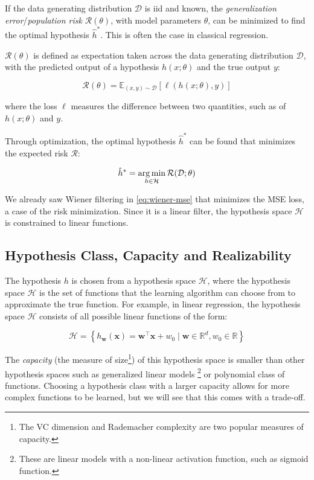 If the data generating distribution $\mathcal{D}$ is \gls{iid} and known, the \textit{generalization error}/\textit{population risk} $\mathcal{R}(\theta)$, with model parameters $\theta$, can be minimized to find the optimal hypothesis $\hat{h}^*$. This is often the case in classical regression.

$\mathcal{R}(\theta)$ is defined as expectation taken across the data generating distribution $\mathcal{D}$, with the predicted output of a hypothesis $h(x; \theta)$ and the true output $y$:

\begin{equation}
    \mathcal{R}(\theta) = \mathbb{E}_{(x, y) \sim \mathcal{D}} \left[ \ell(h(x; \theta), y) \right]
\end{equation}

where the loss $\ell$ measures the difference between two quantities, such as of $h(x; \theta)$ and $y$.

Through optimization, the optimal hypothesis $\hat{h}^*$ can be found that minimizes the expected risk $\mathcal{R}$:

\begin{equation}
    \hat{h}^* = \operatorname*{arg\,min}_{h \in \mathcal{H}} \mathcal{R}(\mathcal{D}; \theta)
\end{equation}

We already saw Wiener filtering in \cref{eq:wiener-mse} that minimizes the \gls{MSE} loss, a case of the risk minimization. Since it is a linear filter, the hypothesis space $\mathcal{H}$ is constrained to linear functions.

\subsection{Hypothesis Class, Capacity and Realizability}
The hypothesis $h$ is chosen from a hypothesis space $\mathcal{H}$, where the hypothesis space $\mathcal{H}$ is the set of functions that the learning algorithm can choose from to approximate the true function. 
For example, in linear regression, the hypothesis space $\mathcal{H}$ consists of all possible linear functions of the form:

\begin{equation}\label{eq:linear-hypothesis}
   \mathcal{H} =  \left\{ h_{\mathbf{w}}(\mathbf{x}) = \mathbf{w}^\top \mathbf{x} + w_0 \mid \mathbf{w} \in \mathbb{R}^d, w_0 \in \mathbb{R} \right\}
\end{equation}

The \textit{capacity} (the measure of size\footnote{The VC dimension and Rademacher complexity are two popular measures of capacity.}) of this hypothesis space is smaller than other hypothesis spaces such as generalized linear models
\footnote{These are linear models with a non-linear activation function, such as sigmoid function.} 
or polynomial class of functions. Choosing a hypothesis class with a larger capacity allows for more complex functions to be learned, but we will see that this comes with a trade-off.

